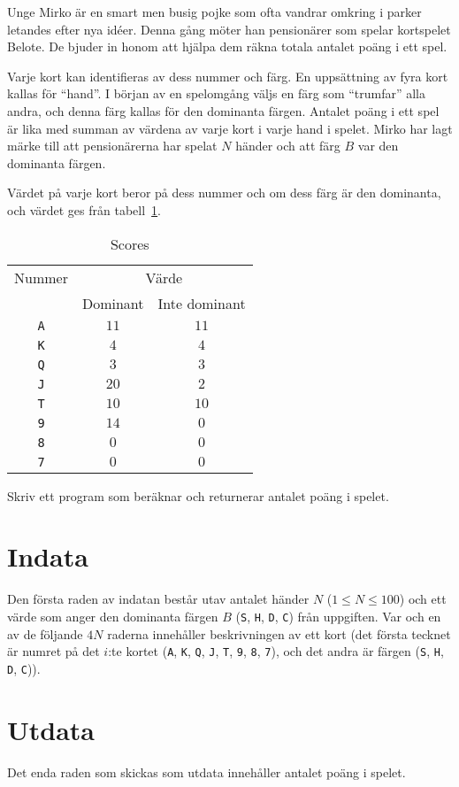 
Unge Mirko är en smart men busig pojke som ofta vandrar omkring i
parker letandes efter nya idéer. Denna gång möter han pensionärer
som spelar kortspelet Belote. De bjuder in honom att hjälpa dem
räkna totala antalet poäng i ett spel.

Varje kort kan identifieras av dess nummer och färg. En uppsättning
av fyra kort kallas för ``hand''. I början av en spelomgång väljs 
en färg som ``trumfar'' alla andra, och denna färg kallas för den
dominanta färgen. Antalet poäng i ett spel är lika med summan av 
värdena av varje kort i varje hand i spelet. Mirko har lagt märke
till att pensionärerna har spelat $N$ händer och att färg $B$ var
den dominanta färgen.

Värdet på varje kort beror på dess nummer och om dess färg är den
dominanta, och värdet ges från tabell~\ref{tab:score}.

\begin{table}[h]
  \centering
  \begin{tabular}{ccc}
    Nummer & \multicolumn{2}{c}{Värde}\\
& Dominant & Inte dominant\\
\texttt{A} & $11$ & $11$\\
\texttt{K} & $4$ & $4$\\
\texttt{Q} & $3$ & $3$\\
\texttt{J} & $20$ & $2$\\
\texttt{T} & $10$ & $10$\\
\texttt{9} & $14$ & $0$\\
\texttt{8} & $0$ & $0$\\
\texttt{7} & $0$ & $0$\\
  \end{tabular}
  \caption{Scores}
  \label{tab:score}
\end{table}


Skriv ett program som beräknar och returnerar antalet poäng i spelet.

\section*{Indata}

Den första raden av indatan består utav antalet händer $N$ ($1 \leq N \leq 100$) och 
ett värde som anger den dominanta färgen $B$ (\texttt{S}, \texttt{H}, \texttt{D}, \texttt{C})
från uppgiften.
Var och en av de följande $4N$ raderna innehåller beskrivningen av ett kort
(det första tecknet är numret på det $i$:te kortet (\texttt{A}, \texttt{K},
\texttt{Q}, \texttt{J}, \texttt{T}, \texttt{9}, \texttt{8}, \texttt{7}),
och det andra är färgen (\texttt{S}, \texttt{H}, \texttt{D}, \texttt{C})).

\section*{Utdata}

Det enda raden som skickas som utdata innehåller antalet poäng i spelet.
